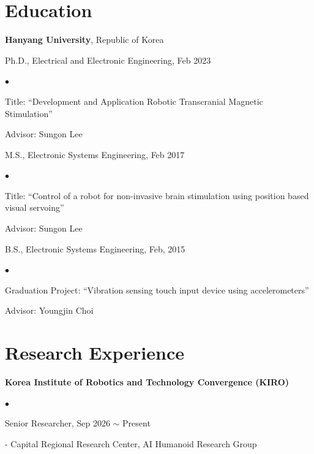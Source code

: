 \documentclass[margin,line]{res}
\newenvironment{list1}{
  \begin{list}{\ding{113}}{%
      \setlength{\itemsep}{0.1in}
      \setlength{\parsep}{0in} \setlength{\parskip}{0in}
      \setlength{\topsep}{0in} \setlength{\partopsep}{0in} 
      \setlength{\leftmargin}{0.17in}}}
      {\end{list}}
\newenvironment{list2}{
  \begin{list}{$\bullet$}{%
      \setlength{\itemsep}{0.05in}
      \setlength{\parsep}{0in} \setlength{\parskip}{0in}
      \setlength{\topsep}{0in} \setlength{\partopsep}{0in} 
      \setlength{\leftmargin}{0.2in}}}{\end{list}}
\begin{document}
\begin{resume}
\section{\sc Education}
{\bf Hanyang University}, Republic of Korea\\
\vspace*{-.1in}
\begin{list1}
\item[] Ph.D., Electrical and Electronic Engineering, Feb 2023
\begin{list2}
\vspace*{.05in}
\item Title:  ``Development and Application Robotic Transcranial Magnetic Stimulation'' 
\item Advisor:  Sungon Lee
\end{list2}
\vspace*{.05in}
\item[] M.S., Electronic Systems Engineering,  Feb 2017
\begin{list2}
\vspace*{.05in}
\item Title:  ``Control of a robot for non-invasive brain stimulation using position based visual servoing'' 
\item Advisor:  Sungon Lee
\end{list2}
\vspace*{.05in}
\item[] B.S., Electronic Systems Engineering,  Feb, 2015
\begin{list2}
\vspace*{.05in}
\item Graduation Project:  ``Vibration sensing touch input device using accelerometers'' 
\item Advisor:  Youngjin Choi
\end{list2}
\end{list1}
\vspace*{+.1in}

\section{\sc Research Experience} 

{\bf Korea Institute of Robotics and Technology Convergence (KIRO)}\\
\vspace*{-.1in}
\begin{list2}
\item Senior Researcher, Sep 2026 $\sim$ Present
\begin{list1}
\vspace*{.04in}
\item[] - Capital Regional Research Center, AI Humanoid Research Group
\end{list1}
\end{list2}


\end{resume}
\end{document}
